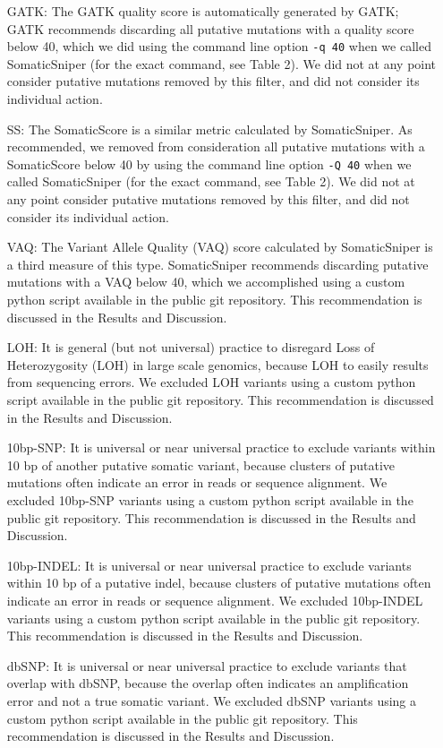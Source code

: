 \documentclass[11pt]{article} %
\begin{document}
{\begin{itemize}
\item[GATK:] The GATK quality score is automatically generated by GATK; GATK recommends discarding all putative mutations with a quality score below 40, which we did using the command line option \texttt{-q 40} when we called SomaticSniper (for the exact command, see Table 2). We did not at any point consider putative mutations removed by this filter, and did not consider its individual action. 
\item[SS:] The SomaticScore is a similar metric calculated by SomaticSniper. As recommended, we removed from consideration all putative mutations with a SomaticScore below 40 by using the command line option \texttt{-Q 40} when we called SomaticSniper (for the exact command, see Table 2). We did not at any point consider putative mutations removed by this filter, and did not consider its individual action. 
\item[VAQ:] The Variant Allele Quality (VAQ) score calculated by SomaticSniper is a third measure of this type. SomaticSniper recommends discarding putative mutations with a VAQ below 40, which we accomplished using a custom python script available in the public git repository. This recommendation is discussed in the Results and Discussion.
\item[LOH:] It is general (but not universal) practice to disregard Loss of Heterozygosity (LOH) in large scale genomics, because LOH to easily results from sequencing errors. We excluded LOH variants using a custom python script available in the public git repository. This recommendation is discussed in the Results and Discussion.
\item[10bp-SNP:] It is universal or near universal practice to exclude variants within 10 bp of another putative somatic variant, because clusters of putative mutations often indicate an error in reads or sequence alignment. We excluded 10bp-SNP variants using a custom python script available in the public git repository. This recommendation is discussed in the Results and Discussion.
\item[10bp-INDEL:] It is universal or near universal practice to exclude variants within 10 bp of a putative indel, because clusters of putative mutations often indicate an error in reads or sequence alignment. We excluded 10bp-INDEL variants using a custom python script available in the public git repository. This recommendation is discussed in the Results and Discussion.
\item[dbSNP:] It is universal or near universal practice to exclude variants that overlap with dbSNP, because the overlap often indicates an amplification error and not a true somatic variant. We excluded dbSNP variants using a custom python script available in the public git repository. This recommendation is discussed in the Results and Discussion.

\end{itemize}}
\end{document}
